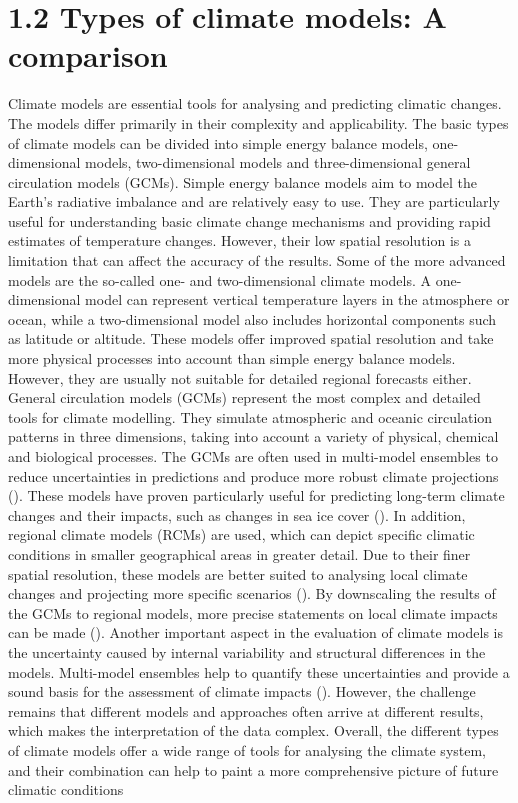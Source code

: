 \documentclass[
]{krantz}
\begin{document}
\section{1.2 Types of climate models: A comparison}\label{types-of-climate-models-a-comparison}

Climate models are essential tools for analysing and predicting climatic changes. The models differ primarily in their complexity and applicability. The basic types of climate models can be divided into simple energy balance models, one-dimensional models, two-dimensional models and three-dimensional general circulation models (GCMs).
Simple energy balance models aim to model the Earth's radiative imbalance and are relatively easy to use. They are particularly useful for understanding basic climate change mechanisms and providing rapid estimates of temperature changes. However, their low spatial resolution is a limitation that can affect the accuracy of the results.
Some of the more advanced models are the so-called one- and two-dimensional climate models. A one-dimensional model can represent vertical temperature layers in the atmosphere or ocean, while a two-dimensional model also includes horizontal components such as latitude or altitude. These models offer improved spatial resolution and take more physical processes into account than simple energy balance models. However, they are usually not suitable for detailed regional forecasts either. General circulation models (GCMs) represent the most complex and detailed tools for climate modelling. They simulate atmospheric and oceanic circulation patterns in three dimensions, taking into account a variety of physical, chemical and biological processes. The GCMs are often used in multi-model ensembles to reduce uncertainties in predictions and produce more robust climate projections (\citet{semenov2010use}). These models have proven particularly useful for predicting long-term climate changes and their impacts, such as changes in sea ice cover (\citet{mohamed2022interannual}).
In addition, regional climate models (RCMs) are used, which can depict specific climatic conditions in smaller geographical areas in greater detail. Due to their finer spatial resolution, these models are better suited to analysing local climate changes and projecting more specific scenarios (\citet{deser}). By downscaling the results of the GCMs to regional models, more precise statements on local climate impacts can be made (\citet{semenov2010use}).
Another important aspect in the evaluation of climate models is the uncertainty caused by internal variability and structural differences in the models. Multi-model ensembles help to quantify these uncertainties and provide a sound basis for the assessment of climate impacts (\citet{semenov2010use}). However, the challenge remains that different models and approaches often arrive at different results, which makes the interpretation of the data complex.
Overall, the different types of climate models offer a wide range of tools for analysing the climate system, and their combination can help to paint a more comprehensive picture of future climatic conditions
\end{document}
